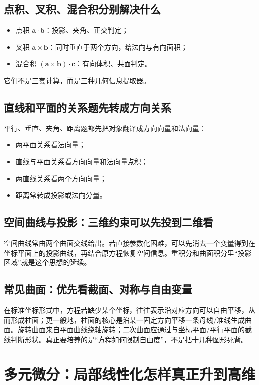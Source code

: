 \documentclass[11pt,a4paper,openany]{ctexbook}
\begin{document}
\section{点积、叉积、混合积分别解决什么}
\begin{itemize}
  \item 点积 $\bm a\cdot\bm b$：投影、夹角、正交判定；
  \item 叉积 $\bm a\times\bm b$：同时垂直于两个方向，给法向与有向面积；
  \item 混合积 $(\bm a\times\bm b)\cdot\bm c$：有向体积、共面判定。
\end{itemize}
它们不是三套计算，而是三种几何信息提取器。

\section{直线和平面的关系题先转成方向关系}
平行、垂直、夹角、距离题都先把对象翻译成方向向量和法向量：
\begin{itemize}
  \item 两平面关系看法向量；
  \item 直线与平面关系看方向向量和法向量点积；
  \item 两直线关系看两个方向向量；
  \item 距离常转成投影或法向分量。
\end{itemize}

\section{空间曲线与投影：三维约束可以先投到二维看}
空间曲线常由两个曲面交线给出。若直接参数化困难，可以先消去一个变量得到在坐标平面上的投影曲线，再结合原方程恢复空间信息。重积分和曲面积分里“投影区域”就是这个思想的延续。

\section{常见曲面：优先看截面、对称与自由变量}
在标准坐标形式中，方程若缺少某个坐标，往往表示沿对应方向可以自由平移，从而形成柱面；更一般地，柱面的核心是沿某一固定方向平移一条母线/准线生成曲面。旋转曲面来自平面曲线绕轴旋转；二次曲面应通过与坐标平面/平行平面的截线判断形状。真正要培养的是“方程如何限制自由度”，不是把十几种图形死背。

\chapter{多元微分：局部线性化怎样真正升到高维}
\end{document}
